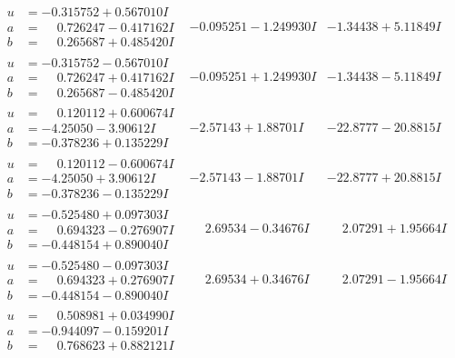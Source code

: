 \documentclass[1p]{elsarticle_modified}
\theoremstyle{definition}
\begin{document}
$$\begin{array}{c|c|c}
\begin{aligned}
u &= -0.315752 + 0.567010 I \\
a &= \phantom{-}0.726247 - 0.417162 I \\
b &= \phantom{-}0.265687 + 0.485420 I\end{aligned}
 & -0.095251 - 1.249930 I & -1.34438 + 5.11849 I \\ \hline\begin{aligned}
u &= -0.315752 - 0.567010 I \\
a &= \phantom{-}0.726247 + 0.417162 I \\
b &= \phantom{-}0.265687 - 0.485420 I\end{aligned}
 & -0.095251 + 1.249930 I & -1.34438 - 5.11849 I \\ \hline\begin{aligned}
u &= \phantom{-}0.120112 + 0.600674 I \\
a &= -4.25050 - 3.90612 I \\
b &= -0.378236 + 0.135229 I\end{aligned}
 & -2.57143 + 1.88701 I & -22.8777 - 20.8815 I \\ \hline\begin{aligned}
u &= \phantom{-}0.120112 - 0.600674 I \\
a &= -4.25050 + 3.90612 I \\
b &= -0.378236 - 0.135229 I\end{aligned}
 & -2.57143 - 1.88701 I & -22.8777 + 20.8815 I \\ \hline\begin{aligned}
u &= -0.525480 + 0.097303 I \\
a &= \phantom{-}0.694323 - 0.276907 I \\
b &= -0.448154 + 0.890040 I\end{aligned}
 & \phantom{-}2.69534 - 0.34676 I & \phantom{-}2.07291 + 1.95664 I \\ \hline\begin{aligned}
u &= -0.525480 - 0.097303 I \\
a &= \phantom{-}0.694323 + 0.276907 I \\
b &= -0.448154 - 0.890040 I\end{aligned}
 & \phantom{-}2.69534 + 0.34676 I & \phantom{-}2.07291 - 1.95664 I \\ \hline\begin{aligned}
u &= \phantom{-}0.508981 + 0.034990 I \\
a &= -0.944097 - 0.159201 I \\
b &= \phantom{-}0.768623 + 0.882121 I\end{aligned}

\end{array}$$
\end{document}
